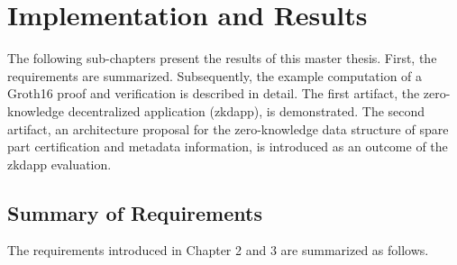\chapter{Implementation and Results}
The following sub-chapters present the results of this master thesis. First, the requirements are summarized. Subsequently, the example computation of a Groth16 proof and verification is described in detail. The first artifact, the zero-knowledge decentralized application (\acrshort{zkdapp}), is demonstrated. The second artifact, an architecture proposal for the zero-knowledge data structure of spare part certification and metadata information, is introduced as an outcome of the \acrshort{zkdapp} evaluation.

\section{Summary of Requirements}
The requirements introduced in Chapter 2 and 3 are summarized as follows.

